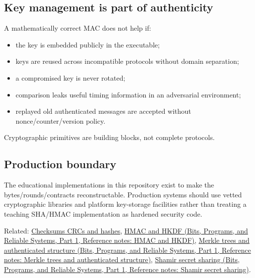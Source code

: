 \subsection{Key management is part of authenticity}\label{appendix-cbe594d1ab0a-key-management-is-part-of-authenticity}

\hypertarget{appendix-cbe594d1ab0a-key-management-is-part-of-authenticity}{}

A mathematically correct MAC does not help if:

\begin{itemize}
\tightlist
\item
  the key is embedded publicly in the executable;
\item
  keys are reused across incompatible protocols without domain separation;
\item
  a compromised key is never rotated;
\item
  comparison leaks useful timing information in an adversarial environment;
\item
  replayed old authenticated messages are accepted without nonce/counter/version policy.
\end{itemize}

Cryptographic primitives are building blocks, not complete protocols.

\subsection{Production boundary}\label{appendix-cbe594d1ab0a-production-boundary}

\hypertarget{appendix-cbe594d1ab0a-production-boundary}{}

The educational implementations in this repository exist to make the bytes/rounds/contracts reconstructable. Production systems should use vetted cryptographic libraries and platform key-storage facilities rather than treating a teaching SHA/HMAC implementation as hardened security code.

Related: \hyperref[appendix-ed338677de0a]{Checksums CRCs and hashes}, \href{../01-Bits-Programs-and-Reliable-Systems-P01/main.pdf\#appendix-50af792c9da7}{HMAC and HKDF (Bits, Programs, and Reliable Systems, Part 1, Reference notes: HMAC and HKDF)}, \href{../01-Bits-Programs-and-Reliable-Systems-P01/main.pdf\#appendix-098192f8d46d}{Merkle trees and authenticated structure (Bits, Programs, and Reliable Systems, Part 1, Reference notes: Merkle trees and authenticated structure)}, \href{../01-Bits-Programs-and-Reliable-Systems-P01/main.pdf\#appendix-5888fd6102dc}{Shamir secret sharing (Bits, Programs, and Reliable Systems, Part 1, Reference notes: Shamir secret sharing)}.
